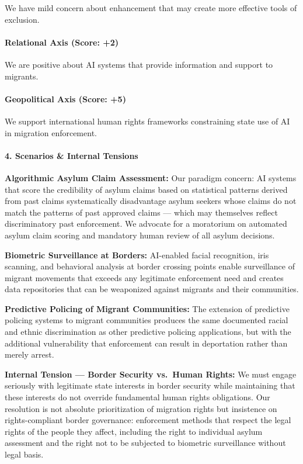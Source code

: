 We have mild concern about enhancement that may create more effective
tools of exclusion.

\paragraph{Relational Axis (Score: +2)}\label{relational-axis-score-2-8}

We are positive about AI systems that provide information and support to
migrants.

\paragraph{Geopolitical Axis (Score:
+5)}\label{geopolitical-axis-score-5-4}

We support international human rights frameworks constraining state use
of AI in migration enforcement.

\paragraph{4. Scenarios \& Internal
Tensions}\label{scenarios-internal-tensions-49}

\textbf{Algorithmic Asylum Claim Assessment:} Our paradigm concern: AI
systems that score the credibility of asylum claims based on statistical
patterns derived from past claims systematically disadvantage asylum
seekers whose claims do not match the patterns of past approved claims
--- which may themselves reflect discriminatory past enforcement. We
advocate for a moratorium on automated asylum claim scoring and
mandatory human review of all asylum decisions.

\textbf{Biometric Surveillance at Borders:} AI-enabled facial
recognition, iris scanning, and behavioral analysis at border crossing
points enable surveillance of migrant movements that exceeds any
legitimate enforcement need and creates data repositories that can be
weaponized against migrants and their communities.

\textbf{Predictive Policing of Migrant Communities:} The extension of
predictive policing systems to migrant communities produces the same
documented racial and ethnic discrimination as other predictive policing
applications, but with the additional vulnerability that enforcement can
result in deportation rather than merely arrest.

\textbf{Internal Tension --- Border Security vs.~Human Rights:} We must
engage seriously with legitimate state interests in border security
while maintaining that these interests do not override fundamental human
rights obligations. Our resolution is not absolute prioritization of
migration rights but insistence on rights-compliant border governance:
enforcement methods that respect the legal rights of the people they
affect, including the right to individual asylum assessment and the
right not to be subjected to biometric surveillance without legal basis.

